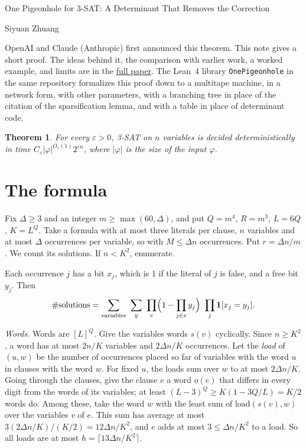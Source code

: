 \documentclass[10pt]{article}
\newtheorem{theorem}{Theorem}
\begin{document}
\begin{center}
{\Large One Pigeonhole for 3-SAT: A Determinant That Removes the Correction}\par{}\par\smallskip
Siyuan Zhuang\par\smallskip
\small OpenAI and Claude (Anthropic) first announced this theorem. This note gives a short proof. The ideas behind it, the comparison with earlier work, a worked example, and limits are in the \href{https://github.com/suquark/NotETHSimplified/blob/main/papers/one-pigeonhole/paper.pdf}{full paper}. The Lean~4 library \texttt{OnePigeonhole} in the same repository formalizes this proof down to a multitape machine, in a network form, with other parameters, with a branching tree in place of the citation of the sparsification lemma, and with a table in place of determinant code.
\end{center}

\begin{theorem}
For every $\varepsilon>0$, 3-SAT on $n$ variables is decided deterministically in time $C_\varepsilon|\varphi|^{O_\varepsilon(1)}2^{\varepsilon n}$, where $|\varphi|$ is the size of the input $\varphi$.
\end{theorem}

\section{The formula}

Fix $\Delta\ge3$ and an integer $m\ge\max(60,\Delta)$, and put $Q=m^4$, $R=m^3$, $L=6Q$, $K=L^Q$. Take a formula with at most three literals per clause, $n$ variables and at most $\Delta$ occurrences per variable, so with $M\le\Delta n$ occurrences. Put $r=\Delta n/m$. We count its solutions. If $n<K^2$, enumerate.

Each occurrence $j$ has a bit $x_j$, which is $1$ if the literal of $j$ is false, and a free bit $y_j$. Then
\begin{equation}\label{count}
\#\text{solutions}=\sum_{\text{variables}}\ \sum_{y}\ \prod_e\Bigl(1-\prod_{j\in e}y_j\Bigr)\ \prod_j\mathbf 1[x_j=y_j].
\end{equation}

\emph{Words.} Words are $[L]^Q$. Give the variables words $s(v)$ cyclically. Since $n\ge K^2$, a word has at most $2n/K$ variables and $2\Delta n/K$ occurrences. Let the \emph{load} of $(u,w)$ be the number of occurrences placed so far of variables with the word $u$ in clauses with the word $w$. For fixed $u$, the loads sum over $w$ to at most $2\Delta n/K$. Going through the clauses, give the clause $e$ a word $o(e)$ that differs in every digit from the words of its variables; at least $(L-3)^Q\ge K(1-3Q/L)=K/2$ words do. Among these, take the word $w$ with the least sum of $\mathrm{load}(s(v),w)$ over the variables $v$ of $e$. This sum has average at most $3(2\Delta n/K)/(K/2)=12\Delta n/K^2$, and $e$ adds at most $3\le\Delta n/K^2$ to a load. So all loads are at most $h=\lceil13\Delta n/K^2\rceil$.
\end{document}
